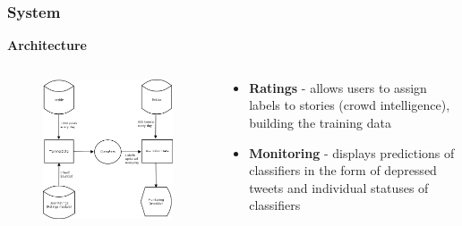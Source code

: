 \documentclass{beamer}
\begin{document}
    \begin{frame}
        \frametitle{System}
        \begin{center}
            \textbf{Architecture}
        \end{center}
        \begin{columns}
            \begin{column}{0.5\textwidth}
                \begin{figure}
                    \centering
                    \includegraphics[width=\textwidth]{figures/Architecture.png}
                \end{figure}
            \end{column}
            \begin{column}{0.5\textwidth}
                \begin{itemize}
                    \item{\textbf{Ratings} - allows users to assign labels to stories (crowd intelligence), building the training data}
                    \item{\textbf{Monitoring} - displays predictions of classifiers in the form of depressed tweets and individual statuses of classifiers}
                \end{itemize}
            \end{column}
        \end{columns}
    \end{frame}
    
\end{document}
